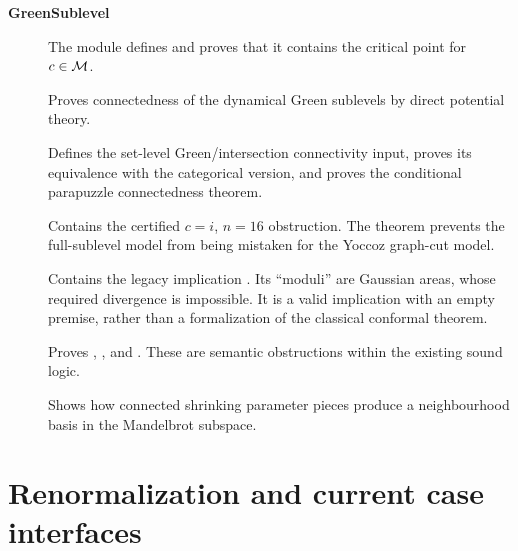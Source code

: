 \begin{description}
\item[\textbf{GreenSublevel}]
The module  defines
 and proves that it contains the
critical point for $c\in\mathcal M$.

\item[]
Proves connectedness of the dynamical Green sublevels by direct potential
theory.

\item[]
Defines the set-level Green/intersection connectivity input, proves its
equivalence with the categorical version, and proves the conditional
parapuzzle connectedness theorem.

\item[]
Contains the certified $c=i$, $n=16$ obstruction.  The theorem
 prevents the
full-sublevel model from being mistaken for the Yoccoz graph-cut model.

\item[]
Contains the legacy implication
.  Its ``moduli'' are
Gaussian areas, whose required divergence is impossible.
It is a valid implication with an empty premise, rather than a
formalization of the classical conformal theorem.

\item[]
Proves ,
, and
.
These are semantic obstructions within the existing sound logic.

\item[]
Shows how connected shrinking parameter pieces produce a neighbourhood basis
in the Mandelbrot subspace.
\end{description}

\section{Renormalization and current case interfaces}

